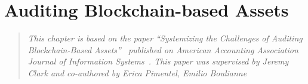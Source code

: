 \chapter{Auditing Blockchain-based Assets} \label{sec:auditing}


\begin{quote}
	\textit{This chapter is based on the paper ``Systemizing the Challenges of Auditing Blockchain-Based Assets''~\cite{pimentel2021systemizing} published on American Accounting Association Journal of Information Systems~\cite{pimentel2021systemizing}. This paper was supervised by Jeremy Clark and co-authored by Erica Pimentel, Emilio Boulianne}
\end{quote}

